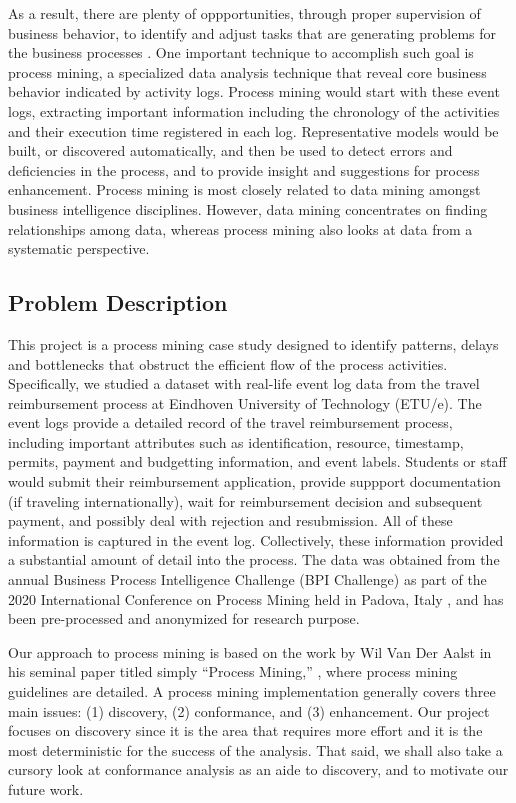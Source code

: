 \documentclass[conference]{IEEEtran}
\begin{document}
As a result, there are plenty of oppportunities, through
proper supervision of business behavior, to identify and adjust
tasks that are generating problems for the business processes
\cite{LeAl1994}.
One important technique to accomplish such goal is process mining, a
specialized data analysis technique that reveal core business behavior
indicated by activity logs.
Process mining would start with these event logs, extracting important
information including the chronology of the activities
 and their execution time registered in each log. Representative models
would be built, or discovered automatically,
and then be used to detect errors and deficiencies in the process,
and to provide insight and suggestions for process enhancement.
Process mining is most closely related to data mining 
amongst business intelligence disciplines. However,
data mining concentrates on finding relationships among data,
whereas process mining also looks at data from a systematic
perspective.

\subsection{Problem Description}

This project is a process mining case study designed to
identify patterns,
delays and bottlenecks that obstruct the efficient flow of the process
activities. Specifically, we studied a dataset with
real-life event log data from the travel reimbursement process at
Eindhoven University of Technology (ETU/e).
The event logs provide a detailed record of the travel reimbursement process,
including important attributes such as identification, resource,
timestamp, permits, payment and budgetting information, and event labels.
Students or staff would submit their reimbursement application,
provide suppport documentation (if traveling internationally), wait for
reimbursement decision and subsequent payment, and possibly deal with
rejection and resubmission. All of these information is captured in the
event log.
Collectively, these information provided a substantial amount of detail
into the process. 
The data was obtained from 
the annual Business Process Intelligence Challenge (BPI Challenge)
as part of
the 2020 International Conference on Process Mining held in Padova, Italy
\cite{BPI2020}, and has been
pre-processed and anonymized for research purpose.

Our approach to process mining is based on the work by
Wil Van Der Aalst in his seminal paper titled simply
``Process Mining,'' \cite{van2012},
where process mining guidelines are detailed.
A process mining implementation generally
covers three main issues: (1) discovery, (2) conformance,
and (3) enhancement.
Our project focuses on discovery since it is the area
that requires more effort and it is the most deterministic for the
success of the analysis. That said, we shall also take a cursory
look at conformance analysis as an aide to discovery,
 and to motivate our future work.
\end{document}
